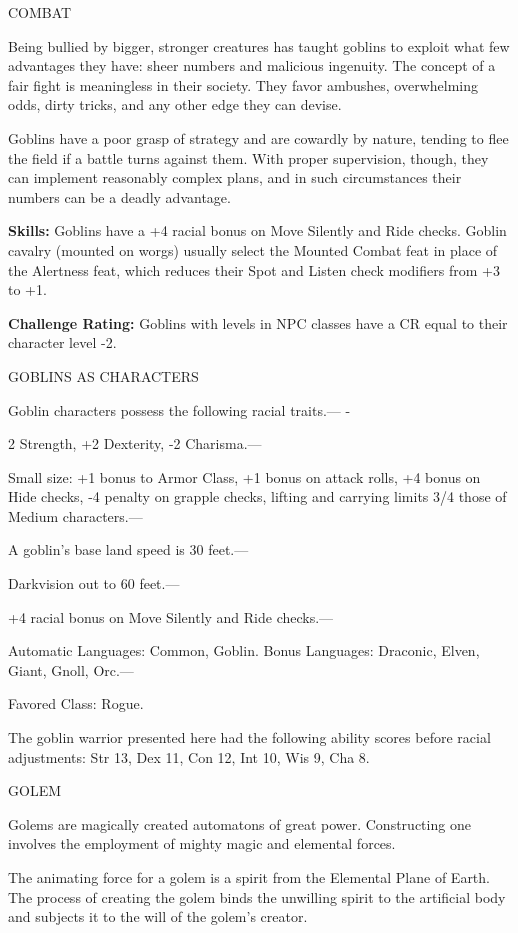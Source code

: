 \documentclass{article}
\begin{document}
COMBAT

Being bullied by bigger, stronger creatures has taught goblins to exploit what 
few advantages they have: sheer numbers and malicious ingenuity. The concept of 
a fair fight is meaningless in their society. They favor ambushes, overwhelming 
odds, dirty tricks, and any other edge they can devise. 

Goblins have a poor grasp of strategy and are cowardly by nature, tending to flee 
the field if a battle turns against them. With proper supervision, though, they 
can implement reasonably complex plans, and in such circumstances their numbers 
can be a deadly advantage.

\textbf{Skills:} Goblins have a +4 racial bonus on Move Silently and Ride checks. 
Goblin cavalry (mounted on worgs) usually select the Mounted Combat feat in place 
of the Alertness feat, which reduces their Spot and Listen check modifiers from 
+3 to +1.

\textbf{Challenge Rating:} Goblins with levels in NPC classes have a CR equal to 
their character level -2.

GOBLINS AS CHARACTERS

Goblin characters possess the following racial traits.--- -

\parindent=3pt
2 Strength, +2 Dexterity, -2 Charisma.---

\parindent=0pt
Small size: +1 bonus to Armor Class, +1 bonus on attack rolls, +4 bonus on Hide 
checks, -4 penalty on grapple checks, lifting and carrying limits 3/4 those of 
Medium characters.---

A goblin's base land speed is 30 feet.---

Darkvision out to 60 feet.--- 

\parindent=3pt
+4 racial bonus on Move Silently and Ride checks.---

\parindent=0pt
Automatic Languages: Common, Goblin. Bonus Languages: Draconic, Elven, Giant, Gnoll, 
Orc.---

Favored Class: Rogue.

The goblin warrior presented here had the following ability scores before racial 
adjustments: Str 13, Dex 11, Con 12, Int 10, Wis 9, Cha 8.

\vspace{12pt}
{\LARGE{}GOLEM}

Golems are magically created automatons of great power. Constructing one involves 
the employment of mighty magic and elemental forces.

The animating force for a golem is a spirit from the Elemental Plane of Earth. 
The process of creating the golem binds the unwilling spirit to the artificial 
body and subjects it to the will of the golem's creator.
\end{document}
